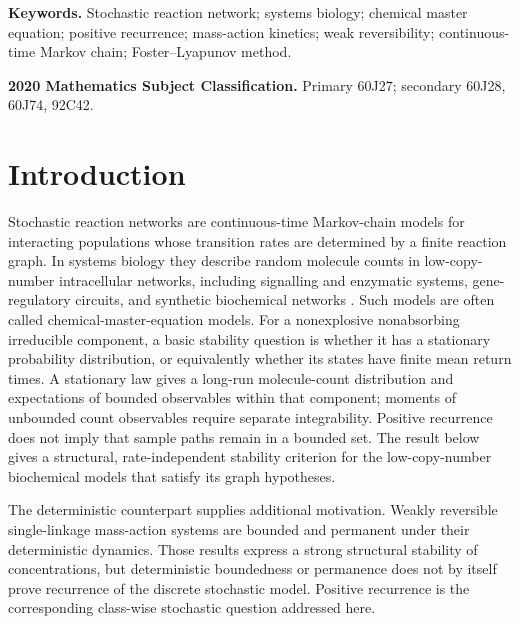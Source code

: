 \noindent\textbf{Keywords.}
Stochastic reaction network; systems biology; chemical master equation;
positive recurrence; mass-action kinetics; weak reversibility; continuous-time
Markov chain; Foster--Lyapunov method.

\medskip
\noindent\textbf{2020 Mathematics Subject Classification.}
Primary 60J27; secondary 60J28, 60J74, 92C42.

\section{Introduction}\label{sec:intro}

Stochastic reaction networks are continuous-time Markov-chain models for
interacting populations whose transition rates are determined by a finite
reaction graph.  In systems biology they describe random molecule counts in
low-copy-number intracellular networks, including signalling and enzymatic
systems, gene-regulatory circuits, and synthetic biochemical networks
\citep{AndersonKurtz2015}.  Such models are often called chemical-master-equation
models.  For a nonexplosive nonabsorbing irreducible component, a basic
stability question
is whether it has a stationary probability distribution, or equivalently
whether its states have finite mean return times.  A stationary law gives a
long-run molecule-count distribution and expectations of bounded observables
within that component; moments of unbounded count observables require separate
integrability.  Positive recurrence does not imply that sample paths remain
in a bounded set.  The result below gives a structural, rate-independent
stability criterion for the low-copy-number biochemical models that satisfy
its graph hypotheses.

The deterministic counterpart supplies additional motivation.  Weakly
reversible single-linkage mass-action systems are bounded
\citep{Anderson2011Boundedness} and permanent \citep{BorosHofbauer2020} under
their deterministic dynamics.  Those results express a strong structural
stability of concentrations, but deterministic boundedness or permanence does
not by itself prove recurrence of the discrete stochastic model.  Positive
recurrence is the corresponding class-wise stochastic question addressed
here.

